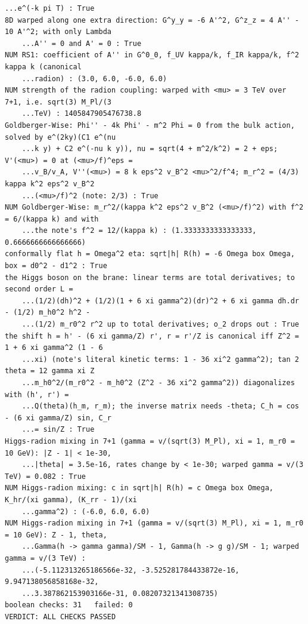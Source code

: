 \documentclass[10pt,a4paper]{article}
\begin{document}
\begin{Verbatim}[fontsize=\small,frame=single,framesep=2mm]
    ...e^(-k pi T) : True
8D warped along one extra direction: G^y_y = -6 A'^2, G^z_z = 4 A'' - 10 A'^2; with only Lambda
    ...A'' = 0 and A' = 0 : True
NUM RS1: coefficient of A'' in G^0_0, f_UV kappa/k, f_IR kappa/k, f^2 kappa k (canonical
    ...radion) : (3.0, 6.0, -6.0, 6.0)
NUM strength of the radion coupling: warped with <mu> = 3 TeV over 7+1, i.e. sqrt(3) M_Pl/(3
    ...TeV) : 1405847905476738.8
Goldberger-Wise: Phi'' - 4k Phi' - m^2 Phi = 0 from the bulk action, solved by e^(2ky)(C1 e^(nu
    ...k y) + C2 e^(-nu k y)), nu = sqrt(4 + m^2/k^2) = 2 + eps; V'(<mu>) = 0 at (<mu>/f)^eps =
    ...v_B/v_A, V''(<mu>) = 8 k eps^2 v_B^2 <mu>^2/f^4; m_r^2 = (4/3) kappa k^2 eps^2 v_B^2
    ...(<mu>/f)^2 (note: 2/3) : True
NUM Goldberger-Wise: m_r^2/(kappa k^2 eps^2 v_B^2 (<mu>/f)^2) with f^2 = 6/(kappa k) and with
    ...the note's f^2 = 12/(kappa k) : (1.3333333333333333, 0.6666666666666666)
conformally flat h = Omega^2 eta: sqrt|h| R(h) = -6 Omega box Omega, box = d0^2 - d1^2 : True
the Higgs boson on the brane: linear terms are total derivatives; to second order L =
    ...(1/2)(dh)^2 + (1/2)(1 + 6 xi gamma^2)(dr)^2 + 6 xi gamma dh.dr - (1/2) m_h0^2 h^2 -
    ...(1/2) m_r0^2 r^2 up to total derivatives; o_2 drops out : True
the shift h = h' - (6 xi gamma/Z) r', r = r'/Z is canonical iff Z^2 = 1 + 6 xi gamma^2 (1 - 6
    ...xi) (note's literal kinetic terms: 1 - 36 xi^2 gamma^2); tan 2 theta = 12 gamma xi Z
    ...m_h0^2/(m_r0^2 - m_h0^2 (Z^2 - 36 xi^2 gamma^2)) diagonalizes with (h', r') =
    ...Q(theta)(h_m, r_m); the inverse matrix needs -theta; C_h = cos - (6 xi gamma/Z) sin, C_r
    ...= sin/Z : True
Higgs-radion mixing in 7+1 (gamma = v/(sqrt(3) M_Pl), xi = 1, m_r0 = 10 GeV): |Z - 1| < 1e-30,
    ...|theta| = 3.5e-16, rates change by < 1e-30; warped gamma = v/(3 TeV) = 0.082 : True
NUM Higgs-radion mixing: c in sqrt|h| R(h) = c Omega box Omega, K_hr/(xi gamma), (K_rr - 1)/(xi
    ...gamma^2) : (-6.0, 6.0, 6.0)
NUM Higgs-radion mixing in 7+1 (gamma = v/(sqrt(3) M_Pl), xi = 1, m_r0 = 10 GeV): Z - 1, theta,
    ...Gamma(h -> gamma gamma)/SM - 1, Gamma(h -> g g)/SM - 1; warped gamma = v/(3 TeV) :
    ...(-5.112313265186566e-32, -3.525281784433872e-16, 9.947138056858168e-32,
    ...3.387862153903166e-31, 0.08207321341308735)
boolean checks: 31   failed: 0
VERDICT: ALL CHECKS PASSED
\end{Verbatim}
\end{document}
